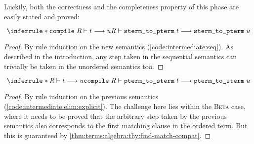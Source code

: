 
\noindent
Luckily, both the correctness and the completeness property of this phase are easily stated and proved:

\begin{theorem}[Correctness]\label{thm:intermediate:seq:correctness}
  \[
    \inferrule*{
      \rewrite{\holconst{compile}\;\R}{t}{u}
    }{\rewrite\R{\holconst{sterm\_to\_pterm}\;t}{\holconst{sterm\_to\_pterm}\;u}}
  \]
\end{theorem}

\begin{proof}
  By rule induction on the new semantics (\cref{code:intermediate:seq}).
  As described in the introduction, any step taken in the sequential semantics can trivially be taken in the unordered semantics too.
\end{proof}

\begin{theorem}[Completeness]\label{thm:intermediate:seq:completeness}
  \[
    \inferrule*{
      \rewrite\R{t}{u}
    }{\rewrite{\holconst{compile}\;\R}{\holconst{pterm\_to\_sterm}\;t}{\holconst{pterm\_to\_sterm}\;u}}
  \]
\end{theorem}

\begin{proof}
  By rule induction on the previous semantics (\cref{code:intermediate:elim:explicit}).
  The challenge here lies within the \textsc{Beta} case, where it needs to be proved that the arbitrary step taken by the previous semantics also corresponds to the first matching clause in the ordered term.
  But this is guaranteed by \cref{thm:terms:algebra:thy:find-match-compat}.
\end{proof}